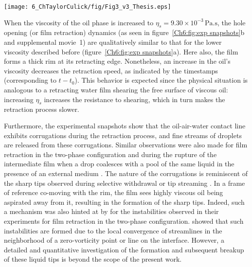 \begin{sidewaysfigure}
	\centering
	\texttt{[image: 6\_ChTaylorCulick/fig/Fig3\_v3\_Thesis.eps]}
	\caption{Time-lapsed snapshots of the post-rupture retraction of water films for different oil viscosities: (a) $\nu_{s}$ = 0.65 cSt, (b) $\nu_{s}$ = 10 cSt, and (c) $\nu_{s}$ = 100 cSt. The rupture location is denoted by the white arrows, while the time stamps indicate the time since rupture is first observed (i.e., $t - t_{0}$). Also see supplemental movie~{\color{Myfig}1}.}
	\label{Ch6:fig:exp snapshots}
\end{sidewaysfigure}

When the viscosity of the oil phase is increased to $\eta_{s} = 9.30 \times 10^{-3}\,\si{\pascal}.\si{\second}$, the hole opening (or film retraction) dynamics (as seen in figure~\ref{Ch6:fig:exp snapshots}b and supplemental movie~{\color{Myfig}1}) are qualitatively similar to that for the lower viscosity described before (figure~\ref{Ch6:fig:exp snapshots}a). Here also, the film forms a thick rim at its retracting edge. Nonetheless, an increase in the oil's viscosity decreases the retraction speed, as indicated by the timestamps (corresponding to $t - t_{0}$). This behavior is expected since the physical situation is analogous to a retracting water film shearing the free surface of viscous oil: increasing $\eta_{s}$ increases the resistance to shearing, which in turn makes the retraction process slower. 

Furthermore, the experimental snapshots show that the oil-air-water contact line exhibits corrugations during the retraction process, and fine streams of droplets are released from these corrugations. Similar observations were also made for film retraction in the two-phase configuration \citep{reyssat-2006-epl, oldenziel-2012-pof} and during the rupture of the intermediate film when a drop coalesces with a pool of the same liquid in the presence of an external medium \citep{aryafar-2008-pre, kavehpour-2015-arfm}. The nature of the corrugations is reminiscent of the sharp tips observed during selective withdrawal \citep{cohen-2002-prl, courrechdupont-2006-prl, courrechdupont-2020-pnas} or tip streaming \citep{montanero-2020-rpp}. In a frame of reference co-moving with the rim, the film sees highly viscous oil being aspirated away from it, resulting in the formation of the sharp tips. Indeed, such a mechanism was also hinted at by \citet{reyssat-2006-epl} for the instabilities observed in their experiments for film retraction in the two-phase configuration. \citet{tseng-2015-jfm} showed that such instabilities are formed due to the local convergence of streamlines in the neighborhood of a zero-vorticity point or line on the interface. However, a detailed and quantitative investigation of the formation and subsequent breakup of these liquid tips is beyond the scope of the present work. 

